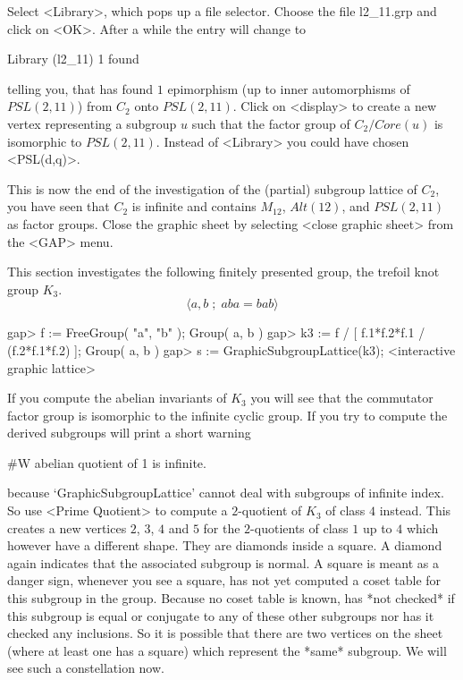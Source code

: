 Select  <Library>, which  pops   up a file  selector.   Choose  the  file
\begintt
l2_11.grp
\endtt and click on <OK>.  After a while the entry will change to

\begintt
Library (l2_11)      1 found 
\endtt

telling  you,  that  {\GAP}  has   found $1$  epimorphism   (up to  inner
automorphisms  of  $PSL(2,11)$) from  $C_2$   onto $PSL(2,11)$.  Click on
<display> to create a  new vertex representing a  subgroup $u$ such  that
the   factor group of  $C_2  /  Core(u)$  is  isomorphic to  $PSL(2,11)$.
Instead of <Library> you could have chosen <PSL(d,q)>.

This  is now  the  end of  the investigation   of the (partial)  subgroup
lattice  of $C_2$, you have  seen  that $C_2$   is infinite and  contains
$M_{12}$, $Alt(12)$, and $PSL(2,11)$ as factor groups.  Close the graphic
sheet by selecting <close graphic sheet> from the <GAP> menu.


This  section  investigates the  following  finitely presented group, the
trefoil knot group $K_3$.
$$
    \langle a, b \;;\; aba = bab \rangle
$$

\begintt
gap> f := FreeGroup( "a", "b" );
Group( a, b )
gap> k3 := f / [ f.1*f.2*f.1 / (f.2*f.1*f.2) ];
Group( a, b )
gap> s := GraphicSubgroupLattice(k3);
<interactive graphic lattice> 
\endtt

If you compute the   abelian invariants of  $K_3$  you will see  that the
commutator factor group  is isomorphic to the  infinite cyclic group.  If
you try  to compute the   derived subgroups  {\GAP}  will print  a  short
warning

\begintt
#W  abelian quotient of 1 is infinite. 
\endtt

because  `GraphicSubgroupLattice'  cannot   deal  with subgroups of  infinite
index.  So  use <Prime Quotient> to   compute a $2$-quotient  of $K_3$ of
class $4$ instead.  This creates a new vertices $2$, $3$, $4$ and $5$ for
the $2$-quotients of  class $1$ up to $4$  which however have a different
shape. They are diamonds inside a square.  A diamond again indicates that
the associated subgroup  is normal.  A square is  meant as a danger sign,
whenever you see a square, {\GAP} has not yet  computed a coset table for
this subgroup in the group.  Because no coset  table is known, {\GAP} has
*not  checked* if this  subgroup is  equal or conjugate   to any of these
other  subgroups nor has  it checked  any  inclusions.  So it is possible
that  there are two  vertices on  the sheet (where    at least one has  a
square) which   represent  the *same* subgroup.    We   will see  such  a
constellation now.

